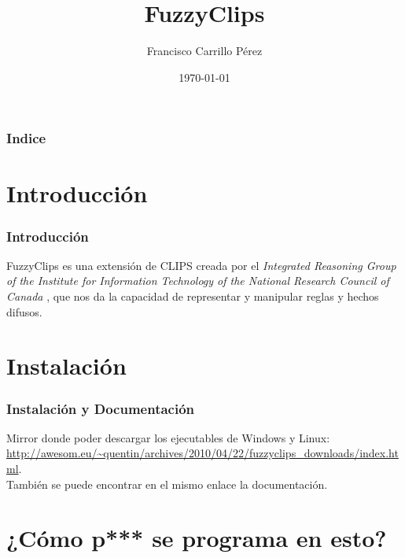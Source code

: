 \documentclass{beamer}
\title[FuzzyClips]{FuzzyClips} %
\author{Francisco Carrillo Pérez} %
\institute[UGR] %
{
Universidad de Granada \\ %
\medskip

}
\date{\today} %
\begin{document}
\begin{frame}
\titlepage %
\end{frame}

\begin{frame}
\frametitle{Indice} %
\tableofcontents %
\end{frame}


\section{Introducción }
\begin{frame}
	\frametitle{Introducción}
	FuzzyClips es una extensión de CLIPS creada por el \textit{Integrated Reasoning Group of the Institute for Information Technology of the National Research Council of Canada }, que nos da la capacidad de representar y manipular reglas y hechos difusos.
\end{frame}

\section{Instalación}
\begin{frame}
	\frametitle{Instalación y Documentación}
	Mirror donde poder descargar los ejecutables de Windows y Linux:
	\url{http://awesom.eu/~quentin/archives/2010/04/22/fuzzyclips_downloads/index.html}.\\
	También se puede encontrar en el mismo enlace la documentación.
\end{frame}

\section{¿Cómo p*** se programa en esto?}
\end{document}
